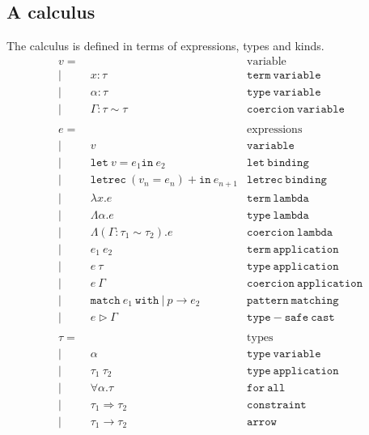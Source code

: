 \subsection{A calculus}
The calculus is defined in terms of expressions, types and kinds.
\begin{align*}
v =&                                 & \text{variable}            \\
  |&\ x : \tau                      & \mathtt{term\ variable}    \\
  |&\ \alpha : \tau                 & \mathtt{type\ variable}    \\
  |&\ \Gamma :  \tau \sim \tau      & \mathtt{coercion\ variable}\\
\\
e =&                                 & \text{expressions}         \\
  |&\ v                              & \mathtt{variable}          \\
  |&\ \mathtt{let}\ v = e_1 \mathtt{in}\ e_2              & \mathtt{let\ binding}    \\
  |&\ \mathtt{let rec}\ (v_n = e_n)+ \mathtt{in}\ e_{n+1} & \mathtt{letrec\ binding} \\
  |&\ \lambda x. e                   & \mathtt{term\ lambda}      \\
  |&\ \Lambda \alpha. e              & \mathtt{type\ lambda}      \\
  |&\ \Lambda (\Gamma : \tau_1 \sim \tau_2). e  & \mathtt{coercion\ lambda} \\
  |&\ e_1\ e_2                       & \mathtt{term\ application} \\
  |&\ e\ \tau                        & \mathtt{type\ application} \\
  |&\ e\ \Gamma                      & \mathtt{coercion\ application} \\
  |&\ \mathtt{match}\ e_1\ \mathtt{with}\ |\ p \rightarrow e_2 & \mathtt{pattern\ matching} \\
  |&\ e \rhd \Gamma                  & \mathtt{type-safe\ cast}   \\
\\
\tau =&                              & \text{types}               \\
  |&\ \alpha                         & \mathtt{type\ variable}    \\
  |&\ \tau_1\ \tau_2                 & \mathtt{type\ application} \\
  |&\ \forall \alpha . \tau          & \mathtt{for\ all}          \\
  |&\ \tau_1 \Rightarrow \tau_2      & \mathtt{constraint}        \\
  |&\ \tau_1 \rightarrow \tau_2      & \mathtt{arrow}             \\
\end{align*}

